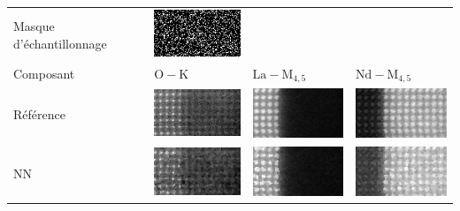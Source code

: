 \setlength{}

\begin{tabular}{m{2cm}*{3}{M{0.24\textwidth}}}
    Masque d'échantillonnage&
    \includegraphics[width=\tmplength]{img/chapitre4/figure9/img/mask.png}&
    &
    \\[30pt]
    Composant&
    {$\mathrm{O-K}$}&
    {$\mathrm{La-M}_{4, 5}$}&
    {$\mathrm{Nd-M}_{4, 5}$}\\
    Référence&
    \includegraphics[width=\tmplength]{img/chapitre4/figure9/img/GT_band_0.png}&
    \includegraphics[width=\tmplength]{img/chapitre4/figure9/img/GT_band_1.png}&
    \includegraphics[width=\tmplength]{img/chapitre4/figure9/img/GT_band_2.png}\\
    NN&
    \includegraphics[width=\tmplength]{img/chapitre4/figure9/img/NN_band_0.png}&
    \includegraphics[width=\tmplength]{img/chapitre4/figure9/img/NN_band_1.png}&
    \includegraphics[width=\tmplength]{img/chapitre4/figure9/img/NN_band_2.png}\\

\end{tabular}

